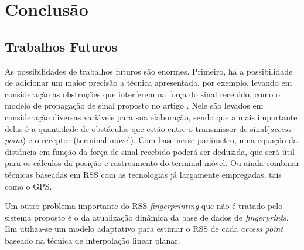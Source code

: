 \chapter{Conclusão}
\label{conclusao}
\begin{comment}
  Os robôs vem sendo muito utilizados na automatização de tarefas, e nesse trabalho podemos perceber que  uma tarefa simples, como deslocar um robô de um lugar a outro, 
  de forma autônoma, exige técnicas complexas de estatística e de várias áreas da computação como inteligência artificial, geometria computacional e processamento de 
  imagens.
  
    O conceito por trás desse trabalho é muito promissor, pois, a idéia de poder clicar em um mapa, ou falar o endereço onde você deseja ir,
    e seu celular ou tablet dirige seu carro para você, sem precisar tocar no volante, é extremamente interessante.
\end{comment}

\section{Trabalhos Futuros}
  As possibilidades de trabalhos futuros são enormes. Primeiro, há a possibilidade de adicionar um maior precisão a técnica 
  apresentada, por exemplo, levando em consideração as obstruções que interferem na força do sinal recebido,
  como o modelo de propagação de sinal proposto no artigo \cite{wifiRadar}. Nele são levados em consideração
  diversas variáveis para sua elaboração, sendo que a mais importante delas é a quantidade de obstáculos que estão 
  entre o transmissor de sinal(\textit{access point}) e o receptor (terminal móvel).
  Com base nesse parâmetro, uma equação da distância em função da força de sinal recebido
  poderá ser deduzida, que será útil para os cálculos da posição e rastreamento
  do terminal móvel. Ou ainda combinar técnicas baseadas em RSS com as tecnologias já largamente empregadas, tais como o GPS.
  
  Um outro problema importante do RSS \textit{fingerprinting} que não é tratado pelo sistema proposto é o da atualização dinâmica da 
  base de dados de \textit{fingerprints}. Em \cite{fingerPrint2} utiliza-se um modelo adaptativo para estimar o 
  RSS de cada \textit{access point} baseado na técnica de interpolação linear planar.
  
